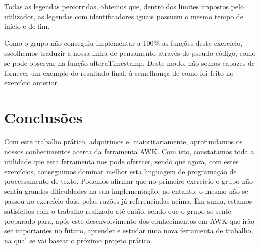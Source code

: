 \documentclass[a4paper]{article}
\begin{document}
Todas as legendas percorridas, obtemos que, dentro dos limites impostos pelo utilizador, as legendas com identificadores iguais possuem o mesmo tempo de início e de fim.

Como o grupo não conseguiu implementar a 100\% as funções deste exercício, escolhemos traduzir a nossa linha de pensamento através de pseudo-código, como se pode observar na função alteraTimestamp. Deste modo, não somos capazes de fornecer um exemplo do resultado final, à semelhança de como foi feito no exercício anterior.

\vspace{500px}
\section{Conclusões}
\label{sec:conclusao}

Com este trabalho prático, adquirimos e, maioritariamente, aprofundamos os nossos conhecimentos acerca da ferramenta AWK. Com isto, constatamos toda a utilidade que esta ferramenta nos pode oferecer, sendo que agora, com estes exercícios, conseguimos dominar melhor esta linguagem de programação de processamento de texto.
Podemos afirmar que no primeiro exercício o grupo não sentiu grandes dificuldades na sua implementação, no entanto, o mesmo não se passou no exercício dois, pelas razões já referenciadas acima.
Em suma, estamos satisfeitos com o trabalho realizado até então, sendo que o grupo se sente preparado para, após este desenvolvimento dos conhecimentos em AWK que irão ser importantes no futuro, aprender e estudar uma nova ferramenta de trabalho, na qual se vai basear o próximo projeto prático.
\end{document}
